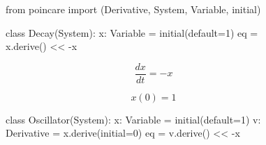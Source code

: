 \documentclass[namedate,numsec,webpdf,modern,large]{oup-authoring-template}
\theoremstyle{thmstyleone}%
\theoremstyle{thmstyletwo}%
\theoremstyle{thmstylethree}%
\newenvironment{CodeInput}{\begin{tcolorbox}[title=input,boxrule=0pt]}{\end{tcolorbox}}
\newcommand{\KeywordTok}[1]{\textcolor[rgb]{0.00,0.13,1.00}{#1}}
\newcommand{\ClassTok}[1]{\textcolor[rgb]{0.27,0.56,0.65}{#1}}
\newcommand{\OperatorTok}[1]{\textcolor[rgb]{0.00,0.00,0.00}{#1}}
\newcommand{\VariableTok}[1]{\textcolor[rgb]{0.00,0.06,0.50}{#1}}
\newcommand{\ValueTok}[1]{\textcolor[rgb]{0.13,0.57,0.41}{#1}}
\newcommand{\FunctionTok}[1]{\textcolor[rgb]{0.47,0.37,0.15}{#1}}
\begin{document}
\begin{figure}[t]
  \begin{minipage}[t]{\columnwidth}    
  \begin{CodeInput}
\begin{Highlighting}[]
\KeywordTok{from} \ClassTok{poincare} \KeywordTok{import} (\ClassTok{Derivative}, \ClassTok{System},
                    \ClassTok{Variable}, \FunctionTok{initial})
\end{Highlighting}
  \end{CodeInput}
  \end{minipage}%
  \newline
  \begin{minipage}[t]{\columnwidth}
  \begin{minipage}[c]{\columnwidth}
  \begin{CodeInput}
\begin{Highlighting}[]
\KeywordTok{class} \ClassTok{Decay}\KeywordTok{(}\ClassTok{System}\KeywordTok{)}\OperatorTok{:}
  \VariableTok{x}\OperatorTok{:} \ClassTok{Variable} \OperatorTok{=} \FunctionTok{initial}\KeywordTok{(}\VariableTok{default}\OperatorTok{=}\ValueTok{1}\KeywordTok{)}
  \VariableTok{eq} \OperatorTok{=} \VariableTok{x}.\FunctionTok{derive}\KeywordTok{()} \OperatorTok{\textless{}\textless{}} \OperatorTok{-}\VariableTok{x}
\end{Highlighting}
  \end{CodeInput}
  \end{minipage}%
  \newline
  \begin{minipage}[c]{0.5\columnwidth}
  \[ \frac{dx}{dt} = -x \]
  \end{minipage}%
  \begin{minipage}[c]{0.5\columnwidth}
  \[ x(0) = 1 \]
  \end{minipage}%
  
  \end{minipage}%
  \newline
  \begin{minipage}[t]{\columnwidth}
  
  \begin{minipage}[c]{\columnwidth}    
  \begin{CodeInput}
\begin{Highlighting}[]
\KeywordTok{class} \ClassTok{Oscillator}\KeywordTok{(}\ClassTok{System}\KeywordTok{)}\OperatorTok{:}
  \VariableTok{x}: \ClassTok{Variable} \OperatorTok{=} \FunctionTok{initial}\KeywordTok{(\VariableTok{default}\OperatorTok{=}\ValueTok{1})}
  \VariableTok{v}: \ClassTok{Derivative} \OperatorTok{=} \VariableTok{x}.\FunctionTok{derive}\KeywordTok{(\VariableTok{initial}\OperatorTok{=}\ValueTok{0})}
  \VariableTok{eq} \OperatorTok{=} \VariableTok{v}.\FunctionTok{derive}\KeywordTok{()} \OperatorTok{\textless{}\textless{}} \OperatorTok{-}\VariableTok{x}
\end{Highlighting}
  \end{CodeInput}
  

\end{minipage}
\end{minipage}
\end{figure}
\end{document}
